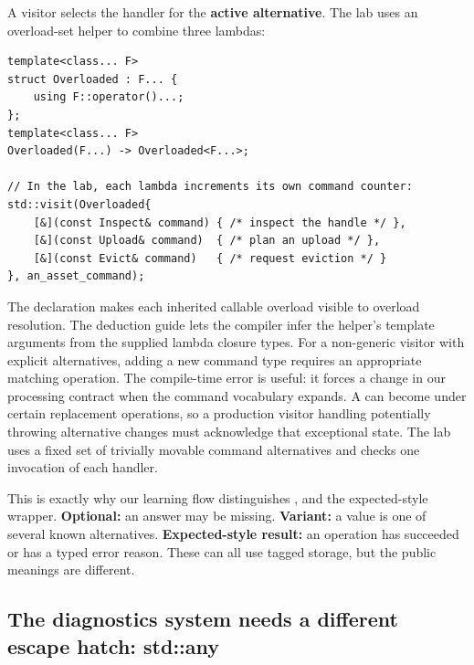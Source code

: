 A visitor selects the handler for the \textbf{active alternative}. The lab uses an overload-set helper to combine three lambdas:

\begin{verbatim}
template<class... F>
struct Overloaded : F... {
    using F::operator()...;
};
template<class... F>
Overloaded(F...) -> Overloaded<F...>;

// In the lab, each lambda increments its own command counter:
std::visit(Overloaded{
    [&](const Inspect& command) { /* inspect the handle */ },
    [&](const Upload& command)  { /* plan an upload */ },
    [&](const Evict& command)   { /* request eviction */ }
}, an_asset_command);
\end{verbatim}

The  declaration makes each inherited callable overload visible to overload resolution. The deduction guide lets the compiler infer the helper's template arguments from the supplied lambda closure types. For a non-generic visitor with explicit alternatives, adding a new command type requires an appropriate matching operation. The compile-time error is useful: it forces a change in our processing contract when the command vocabulary expands. A  can become  under certain replacement operations, so a production visitor handling potentially throwing alternative changes must acknowledge that exceptional state. The lab uses a fixed set of trivially movable command alternatives and checks one invocation of each handler.

This is exactly why our learning flow distinguishes ,  and the expected-style wrapper. \textbf{Optional:} an answer may be missing. \textbf{Variant:} a value is one of several known alternatives. \textbf{Expected-style result:} an operation has succeeded or has a typed error reason. These can all use tagged storage, but the public meanings are different.

\subsection{The diagnostics system needs a different escape hatch: std::any}\label{05-engine-i-ch006-the-diagnostics-system-needs-a-different-escape-hatch-stdany}

\hypertarget{05-engine-i-ch006-the-diagnostics-system-needs-a-different-escape-hatch-stdany}{}

